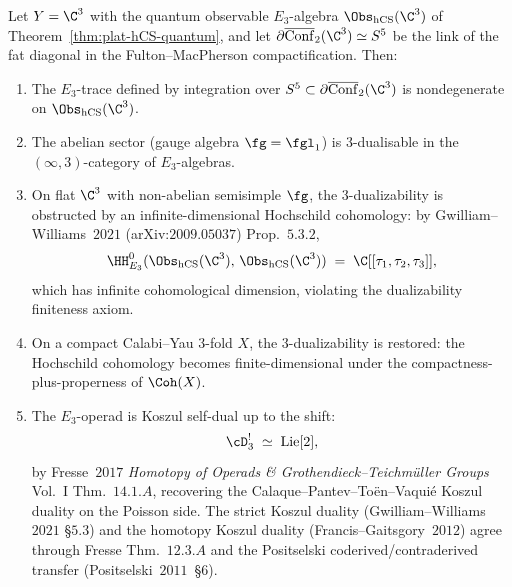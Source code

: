 \begin{theorem}
\label{thm:plat-dualizability}
Let $Y = \C^3$ with the quantum observable $E_3$-algebra
$\Obs_{\hCS}(\C^3)$ of Theorem~\ref{thm:plat-hCS-quantum}, and let
$\partial\overline{\mathrm{Conf}}_2(\C^3) \simeq S^5$ be the link of
the fat diagonal in the Fulton--MacPherson compactification. Then:
\begin{enumerate}[label=\textup{(\roman*)}]
\item The $E_3$-trace defined by integration over
$S^5 \subset \partial\overline{\mathrm{Conf}}_2(\C^3)$ is
nondegenerate on $\Obs_{\hCS}(\C^3)$.
\item The abelian sector (gauge algebra $\fg = \fgl_1$) is
$3$-dualisable in the $(\infty,3)$-category of $E_3$-algebras.
\item On flat $\C^3$ with non-abelian semisimple $\fg$, the
$3$-dualizability is obstructed by an infinite-dimensional
Hochschild cohomology: by Gwilliam--Williams~$2021$
(arXiv:$2009.05037$) Prop.~$5.3.2$,
\[
 \HH^0_{E_3}(\Obs_{\hCS}(\C^3),\, \Obs_{\hCS}(\C^3))
 \;=\; \C[[\tau_1, \tau_2, \tau_3]],
\]
which has infinite cohomological dimension, violating the dualizability
finiteness axiom.
\item On a compact Calabi--Yau $3$-fold $X$, the $3$-dualizability is
restored: the Hochschild cohomology becomes finite-dimensional
under the compactness-plus-properness of $\Coh(X)$.
\item The $E_3$-operad is Koszul self-dual up to the shift:
\[
 \cD_3^! \;\simeq\; \mathrm{Lie}[2],
\]
by Fresse~$2017$ \emph{Homotopy of Operads \& Grothendieck--Teichm\"uller Groups}
Vol.~I Thm.~$14.1.A$, recovering the Calaque--Pantev--To\"en--Vaqui\'e
Koszul duality on the Poisson side. The strict
Koszul duality (Gwilliam--Williams~$2021$ \S$5.3$) and the
homotopy Koszul duality (Francis--Gaitsgory~$2012$) agree through
Fresse Thm.~$12.3.A$ and the Positselski coderived/contraderived
transfer (Positselski~$2011$~\S$6$).
\end{enumerate}
\end{theorem}

